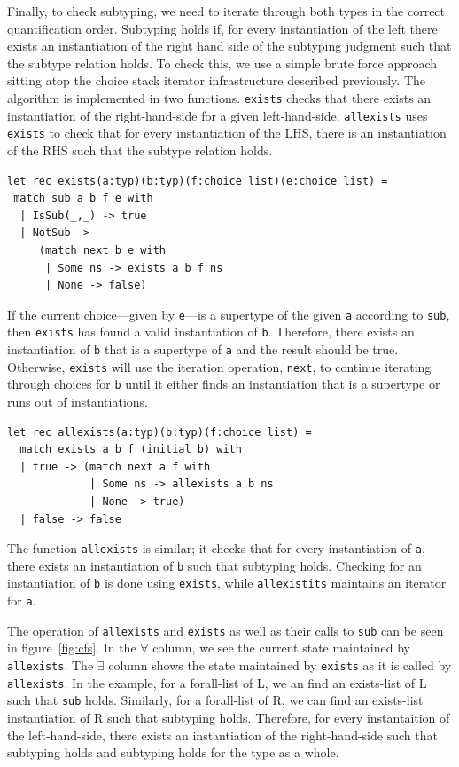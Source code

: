\documentclass[a4paper,english]{lipics-v2019}
\begin{document}
Finally, to check subtyping, we need to iterate through both types in the
correct quantification order. Subtyping holds if, for every instantiation of
the left there exists an instantiation of the right hand side of the
subtyping judgment such that the subtype relation holds. To check this, we
use a simple brute force approach sitting atop the choice stack iterator
infrastructure described previously. The algorithm is implemented in two
functions. \verb|exists| checks that there exists an instantiation of the
right-hand-side for a given left-hand-side. \verb|allexists| uses
\verb|exists| to check that for every instantiation of the LHS, there is an
instantiation of the RHS such that the subtype relation holds.


\begin{lstlisting}
let rec exists(a:typ)(b:typ)(f:choice list)(e:choice list) =
 match sub a b f e with 
  | IsSub(_,_) -> true 
  | NotSub -> 
     (match next b e with
      | Some ns -> exists a b f ns 
      | None -> false) 
\end{lstlisting}

If the current choice---given by \verb|e|---is a supertype of the given
\verb|a| according to \verb|sub|, then \verb|exists| has found a valid
instantiation of \verb|b|. Therefore, there exists an instantiation of
\verb|b| that is a supertype of \verb|a| and the result should be true.
Otherwise, \verb|exists| will use the iteration operation, \verb|next|, to
continue iterating through choices for \verb|b| until it either finds an
instantiation that is a supertype or runs out of instantiations.

 \begin{lstlisting}
let rec allexists(a:typ)(b:typ)(f:choice list) =
  match exists a b f (initial b) with 
  | true -> (match next a f with
             | Some ns -> allexists a b ns 
             | None -> true) 
  | false -> false
\end{lstlisting}

The function \verb|allexists| is similar; it checks that for every
instantiation of \verb|a|, there exists an instantiation of 
\verb|b| such that subtyping holds. Checking for an instantiation
of \verb|b| is done using \verb|exists|, while \verb|allexistits|
maintains an iterator for \verb|a|.

The operation of \verb|allexists| and \verb|exists| as well as their
calls to \verb|sub| can be seen in figure~\ref{fig:cfs}. In the
$\forall$ column, we see the current state maintained by \verb|allexists|.
The $\exists$ column shows the state maintained by \verb|exists| as it is
called by \verb|allexists|. In the example, for a forall-list of L, we an
find an exists-list of L such that \verb|sub| holds. Similarly,
for a forall-list of R, we can find an exists-list instantiation of R such
that subtyping holds. Therefore, for every instantaition of the left-hand-side,
there exists an instantiation of the right-hand-side such that subtyping holds
and subtyping holds for the type as a whole.
\end{document}
